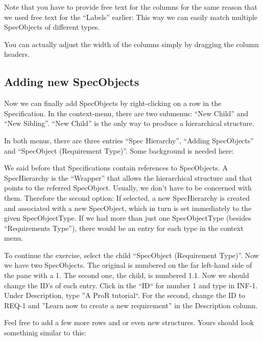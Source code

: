 Note that you have to provide free text for the columns for the same reason that we used free text for the ``Labels'' earlier: This way we can easily match multiple SpecObjects of different types.

You can actually adjust the width of the columns simply by dragging the column headers.

\subsection{Adding new SpecObjects}

Now we can finally add SpecObjects by right-clicking on a row in the Specification.  In the context-menu, there are two submenus: ``New Child'' and ``New Sibling''.  ``New Child'' is the only way to produce a hierarchical structure.

In both menus, there are three entries ``Spec Hierarchy'', ``Adding SpecObjects'' and ``SpecObject (Requirement Type)''.  Some background is needed here:

We said before that Specifications contain references to SpecObjects.  A SpecHierarchy is the ``Wrapper'' that allows the hierarchical structure and that points to the referred SpecObject.  Usually, we don't have to be concerned with them.  Therefore the second option: If selected, a new SpecHierarchy is created and associated with a new SpecObject, which in turn is set immediately to the given SpecObjectType.  If we had more than just one SpecObjectType (besides ``Requirements Type''), there would be an entry for each type in the context menu.

To continue the exercise, select the child ``SpecObject (Requirement Type)''.  Now we have two SpecObjects.  The original is numbered on the far left-hand side of the pane with a 1.  The second one, the child, is numbered 1.1.  Now we should change the ID's of each entry.  Click in the ``ID`` for number 1 and type in INF-1.  Under Description, type ''A ProR tutorial``.  For the second, change the ID to REQ-1 and ''Learn now to create a new requirement'' in the Description column.

Feel free to add a few more rows and or even new structures.  Yours should look somethinig similar to this:

